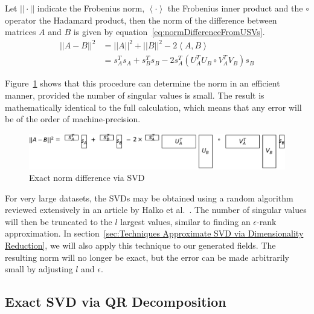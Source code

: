 \documentclass{acm_proc_article-sp}
\begin{document}
Let $|| \cdot ||$ indicate the Frobenius norm, $\left\langle \cdot \right\rangle$ the Frobenius inner product and the $\circ$ operator the Hadamard product, then the norm of the difference between matrices $A$ and $B$ is given by equation~\ref{eq:normDifferenceFromUSVs}.
\begin{equation}
\label{eq:normDifferenceFromUSVs}
\begin{split}
||A-B||^{2} & = ||A||^{2} + ||B||^{2} - 2 \left\langle A, B \right\rangle \\
& = s_{A}^{T} s_{A} +  s_{B}^{T} s_{B} - 2 s_{A}^{T} \left( U_{A}^{T} U_{B} \circ V_{A}^{T} V_{B} \right) s_{B}
\end{split}
\end{equation}

Figure~\ref{fig:normDifferenceFromUSVs} shows that this procedure can determine the norm in an efficient manner, provided the number of singular values is small. The result is mathematically identical to the full calculation, which means that any error will be of the order of machine-precision.

\begin{figure}[h]
\begin{center}
\includegraphics[width=\columnwidth]{Results/normDifferenceFromUSVs.pdf}
\caption[Exact norm difference via SVD]{Exact norm difference via SVD}
\label{fig:normDifferenceFromUSVs}
\end{center}
\end{figure}
For very large datasets, the SVDs may be obtained using a random algorithm reviewed extensively in an article by Halko et al.~\cite{Halko2011}. The number of singular values will then be truncated to the $l$ largest values, similar to finding an $\epsilon$-rank approximation. In section~\ref{sec:Techniques Approximate SVD via Dimensionality Reduction}, we will also apply this technique to our generated fields. The resulting norm will no longer be exact, but the error can be made arbitrarily small by adjusting $l$ and $\epsilon$.

\subsection{Exact SVD via QR Decomposition}
\label{sec:Techniques Exact SVD via QR Decomposition}
\end{document}

